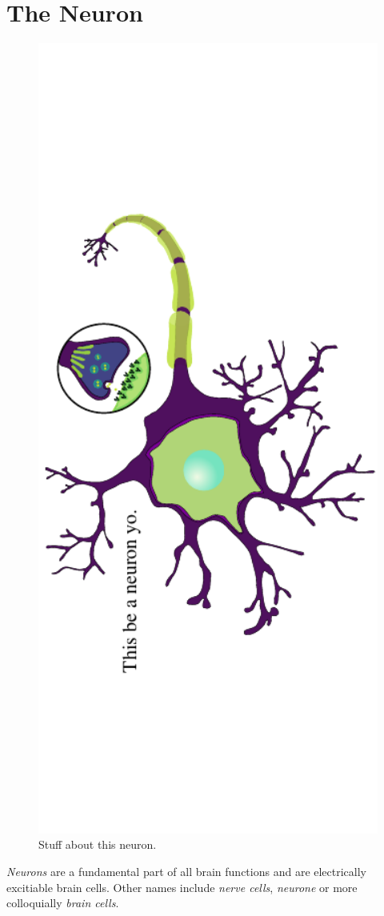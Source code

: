 \documentclass[altfont, fleqn]{uiophd}
\begin{document}
\section{The Neuron}
\begin{figure}[h]
    \centering
    \includegraphics[angle=-90,width=1.0\textwidth]{images/2_1/neuron_structure.pdf}
    \caption{Stuff about this neuron.}
    \label{fig:2_1_neuron}
\end{figure}
\noindent
\emph{Neurons} 
are a fundamental part of all brain functions and 
are electrically excitiable brain cells.
Other names include \emph{nerve cells}, \emph{neurone} or more 
colloquially \emph{brain cells}.
\end{document}
